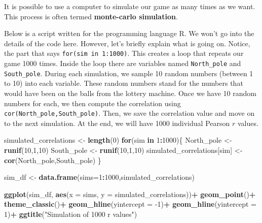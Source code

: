 \documentclass[
]{book}
\newenvironment{Shaded}{\begin{snugshade}}{\end{snugshade}}
\newcommand{\ControlFlowTok}[1]{\textcolor[rgb]{0.13,0.29,0.53}{\textbf{#1}}}
\newcommand{\DataTypeTok}[1]{\textcolor[rgb]{0.13,0.29,0.53}{#1}}
\newcommand{\DecValTok}[1]{\textcolor[rgb]{0.00,0.00,0.81}{#1}}
\newcommand{\KeywordTok}[1]{\textcolor[rgb]{0.13,0.29,0.53}{\textbf{#1}}}
\newcommand{\NormalTok}[1]{#1}
\newcommand{\OperatorTok}[1]{\textcolor[rgb]{0.81,0.36,0.00}{\textbf{#1}}}
\newcommand{\StringTok}[1]{\textcolor[rgb]{0.31,0.60,0.02}{#1}}
\begin{document}
It is possible to use a computer to simulate our game as many times as we want. This process is often termed \textbf{monte-carlo simulation}.

Below is a script written for the programming language R. We won't go into the details of the code here. However, let's briefly explain what is going on. Notice, the part that says \texttt{for(sim\ in\ 1:1000)}. This creates a loop that repeats our game 1000 times. Inside the loop there are variables named \texttt{North\_pole} and \texttt{South\_pole}. During each simulation, we sample 10 random numbers (between 1 to 10) into each variable. These random numbers stand for the numbers that would have been on the balls from the lottery machine. Once we have 10 random numbers for each, we then compute the correlation using \texttt{cor(North\_pole,South\_pole)}. Then, we save the correlation value and move on to the next simulation. At the end, we will have 1000 individual Pearson \(r\) values.

\begin{Shaded}
\begin{Highlighting}[]
\NormalTok{simulated_correlations <-}\StringTok{ }\KeywordTok{length}\NormalTok{(}\DecValTok{0}\NormalTok{)}
\ControlFlowTok{for}\NormalTok{(sim }\ControlFlowTok{in} \DecValTok{1}\OperatorTok{:}\DecValTok{1000}\NormalTok{)\{}
\NormalTok{  North_pole <-}\StringTok{ }\KeywordTok{runif}\NormalTok{(}\DecValTok{10}\NormalTok{,}\DecValTok{1}\NormalTok{,}\DecValTok{10}\NormalTok{)}
\NormalTok{  South_pole <-}\StringTok{ }\KeywordTok{runif}\NormalTok{(}\DecValTok{10}\NormalTok{,}\DecValTok{1}\NormalTok{,}\DecValTok{10}\NormalTok{)}
\NormalTok{  simulated_correlations[sim] <-}\StringTok{ }\KeywordTok{cor}\NormalTok{(North_pole,South_pole)}
\NormalTok{\}}

\NormalTok{sim_df <-}\StringTok{ }\KeywordTok{data.frame}\NormalTok{(}\DataTypeTok{sims=}\DecValTok{1}\OperatorTok{:}\DecValTok{1000}\NormalTok{,simulated_correlations)}

\KeywordTok{ggplot}\NormalTok{(sim_df, }\KeywordTok{aes}\NormalTok{(}\DataTypeTok{x =}\NormalTok{ sims, }\DataTypeTok{y =}\NormalTok{ simulated_correlations))}\OperatorTok{+}
\StringTok{  }\KeywordTok{geom_point}\NormalTok{()}\OperatorTok{+}
\StringTok{  }\KeywordTok{theme_classic}\NormalTok{()}\OperatorTok{+}
\StringTok{  }\KeywordTok{geom_hline}\NormalTok{(}\DataTypeTok{yintercept =} \DecValTok{-1}\NormalTok{)}\OperatorTok{+}
\StringTok{  }\KeywordTok{geom_hline}\NormalTok{(}\DataTypeTok{yintercept =} \DecValTok{1}\NormalTok{)}\OperatorTok{+}
\StringTok{  }\KeywordTok{ggtitle}\NormalTok{(}\StringTok{"Simulation of 1000 r values"}\NormalTok{)}
\end{Highlighting}
\end{Shaded}
\end{document}
